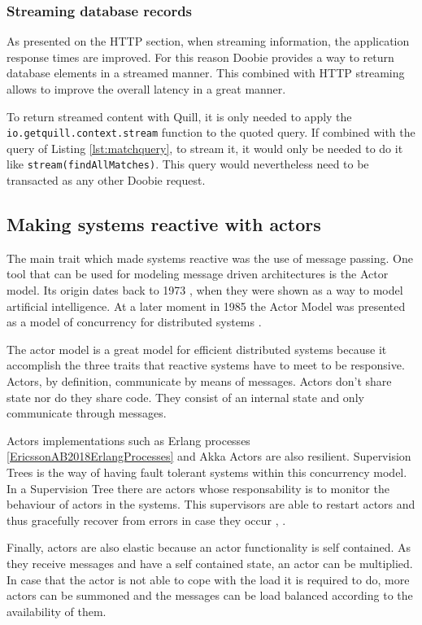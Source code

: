 \documentclass[../main.tex]{subfiles}
\begin{document}
\subsubsection{Streaming database records}
As presented on the HTTP section, when streaming information, the application
response times are improved. For this reason Doobie provides a way to return
database elements in a streamed manner. This combined with HTTP streaming allows
to improve the overall latency in a great manner.

To return streamed content with Quill, it is only needed to apply the
\texttt{io.getquill.context.stream} function to the quoted query. If combined
with the query of Listing \ref{lst:matchquery}, to stream it, it would only be
needed to do it like \texttt{stream(findAllMatches)}. This query would
nevertheless need to be transacted as any other Doobie request.

\subsection{Making systems reactive with actors}
The main trait which made systems reactive was the use of message passing. One
tool that can be used for modeling message driven architectures is the Actor
model. Its origin dates back to  1973 \autocite{HewittAFormalism}, when they were shown as a way to
model artificial intelligence. At a later moment in 1985 the Actor Model was
presented as a model of concurrency for distributed systems \autocite{Agha1985ACTORS:Systems}.

The
actor model is a great model for efficient distributed systems because it
accomplish the three traits that reactive systems have to meet to be responsive.
Actors, by definition, communicate by means of messages. Actors don't share state nor do they share
code. They consist of an internal state and only communicate through messages.

Actors implementations such as Erlang processes \ref{EricssonAB2018ErlangProcesses} and Akka Actors \autocite{LightbendInc.2020AkkaActors}
are also resilient.
Supervision Trees is the way of having fault tolerant systems within this
concurrency model. In a Supervision Tree there are actors whose responsability
is to monitor the behaviour of actors in the systems. This supervisors are able to
restart actors and thus gracefully recover from errors in case they occur
\autocite{ErlangBehaviour}, \autocite{SupervisionDocumentation}.

Finally, actors are also elastic because an actor functionality is self
contained. As they receive messages and have a self contained state, an actor can be
multiplied. In case that the actor is not able to cope with the load it is
required to do, more actors can be summoned and the messages can be load balanced
according to the availability of them.
\end{document}
